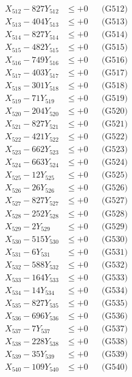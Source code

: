 \documentclass[a4paper,10pt]{article}
\begin{document}
{\begin{align}
X_{512} - 827Y_{512} &\leq +0 && \text{(G512)} \\
X_{513} - 404Y_{513} &\leq +0 && \text{(G513)} \\
X_{514} - 827Y_{514} &\leq +0 && \text{(G514)} \\
X_{515} - 482Y_{515} &\leq +0 && \text{(G515)} \\
X_{516} - 749Y_{516} &\leq +0 && \text{(G516)} \\
X_{517} - 403Y_{517} &\leq +0 && \text{(G517)} \\
X_{518} - 301Y_{518} &\leq +0 && \text{(G518)} \\
X_{519} - 71Y_{519} &\leq +0 && \text{(G519)} \\
X_{520} - 204Y_{520} &\leq +0 && \text{(G520)} \\
\allowbreak
X_{521} - 827Y_{521} &\leq +0 && \text{(G521)} \\
X_{522} - 421Y_{522} &\leq +0 && \text{(G522)} \\
X_{523} - 662Y_{523} &\leq +0 && \text{(G523)} \\
X_{524} - 663Y_{524} &\leq +0 && \text{(G524)} \\
X_{525} - 12Y_{525} &\leq +0 && \text{(G525)} \\
X_{526} - 26Y_{526} &\leq +0 && \text{(G526)} \\
X_{527} - 827Y_{527} &\leq +0 && \text{(G527)} \\
X_{528} - 252Y_{528} &\leq +0 && \text{(G528)} \\
X_{529} - 2Y_{529} &\leq +0 && \text{(G529)} \\
X_{530} - 515Y_{530} &\leq +0 && \text{(G530)} \\
\allowbreak
X_{531} - 6Y_{531} &\leq +0 && \text{(G531)} \\
X_{532} - 588Y_{532} &\leq +0 && \text{(G532)} \\
X_{533} - 164Y_{533} &\leq +0 && \text{(G533)} \\
X_{534} - 14Y_{534} &\leq +0 && \text{(G534)} \\
X_{535} - 827Y_{535} &\leq +0 && \text{(G535)} \\
X_{536} - 696Y_{536} &\leq +0 && \text{(G536)} \\
X_{537} - 7Y_{537} &\leq +0 && \text{(G537)} \\
X_{538} - 228Y_{538} &\leq +0 && \text{(G538)} \\
X_{539} - 35Y_{539} &\leq +0 && \text{(G539)} \\
X_{540} - 109Y_{540} &\leq +0 && \text{(G540)} \\

\end{align}}
\end{document}
